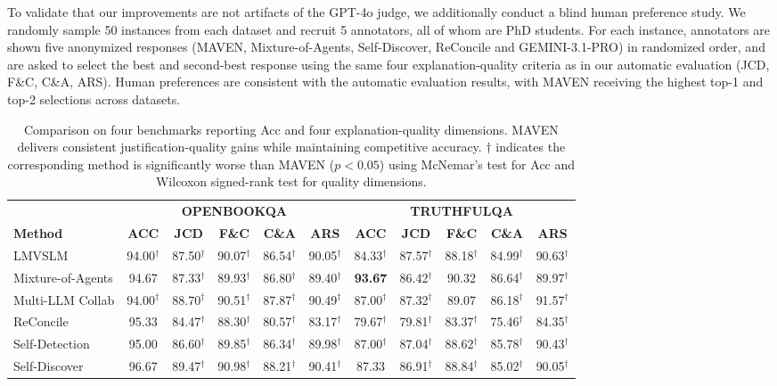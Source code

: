 \documentclass{article}
\begin{document}
To validate that our improvements are not artifacts of the GPT-4o judge, we additionally conduct a blind human preference study. We randomly sample 50 instances from each dataset and recruit 5 annotators, all of whom are PhD students. For each instance, annotators are shown five anonymized responses (MAVEN, Mixture-of-Agents, Self-Discover, ReConcile and GEMINI-3.1-PRO) in randomized order, and are asked to select the best and second-best response using the same four explanation-quality criteria as in our automatic evaluation (JCD, F\&C, C\&A, ARS). Human preferences are consistent with the automatic evaluation results, with MAVEN receiving the highest top-1 and top-2 selections across datasets.

\begin{table}[t]
\caption{Comparison on four benchmarks reporting Acc and four explanation-quality dimensions. MAVEN delivers consistent justification-quality gains while maintaining competitive accuracy. $\dagger$ indicates the corresponding method is significantly worse than MAVEN ($p<0.05$) using McNemar's test for Acc and Wilcoxon signed-rank test for quality dimensions.}
\label{tab:main_results}
\centering
\setlength{\tabcolsep}{2pt}

\begin{tabular}{l ccccc ccccc}
\toprule
& \multicolumn{5}{c}{\textbf{OPENBOOKQA}} & \multicolumn{5}{c}{\textbf{TRUTHFULQA}} \\
\cmidrule(lr){2-6} \cmidrule(lr){7-11}
\textbf{Method} & \textbf{ACC} & \textbf{JCD} & \textbf{F\&C} & \textbf{C\&A} & \textbf{ARS} & \textbf{ACC} & \textbf{JCD} & \textbf{F\&C} & \textbf{C\&A} & \textbf{ARS} \\
\midrule
LMVSLM & 94.00$^\dagger$ & 87.50$^\dagger$ & 90.07$^\dagger$ & 86.54$^\dagger$ & 90.05$^\dagger$ & 84.33$^\dagger$ & 87.57$^\dagger$ & 88.18$^\dagger$ & 84.99$^\dagger$ & 90.63$^\dagger$ \\
Mixture-of-Agents & 94.67 & 87.33$^\dagger$ & 89.93$^\dagger$ & 86.80$^\dagger$ & 89.40$^\dagger$ & \textbf{93.67} & 86.42$^\dagger$ & 90.32 & 86.64$^\dagger$ & 89.97$^\dagger$ \\
Multi-LLM Collab & 94.00$^\dagger$ & 88.70$^\dagger$ & 90.51$^\dagger$ & 87.87$^\dagger$ & 90.49$^\dagger$ & 87.00$^\dagger$ & 87.32$^\dagger$ & 89.07 & 86.18$^\dagger$ & 91.57$^\dagger$ \\
ReConcile & 95.33 & 84.47$^\dagger$ & 88.30$^\dagger$ & 80.57$^\dagger$ & 83.17$^\dagger$ & 79.67$^\dagger$ & 79.81$^\dagger$ & 83.37$^\dagger$ & 75.46$^\dagger$ & 84.35$^\dagger$ \\
Self-Detection & 95.00 & 86.60$^\dagger$ & 89.85$^\dagger$ & 86.34$^\dagger$ & 89.98$^\dagger$ & 87.00$^\dagger$ & 87.04$^\dagger$ & 88.62$^\dagger$ & 85.78$^\dagger$ & 90.43$^\dagger$ \\
Self-Discover & 96.67 & 89.47$^\dagger$ & 90.98$^\dagger$ & 88.21$^\dagger$ & 90.41$^\dagger$ & 87.33 & 86.91$^\dagger$ & 88.84$^\dagger$ & 85.02$^\dagger$ & 90.05$^\dagger$ \\


\end{tabular}
\end{table}
\end{document}
